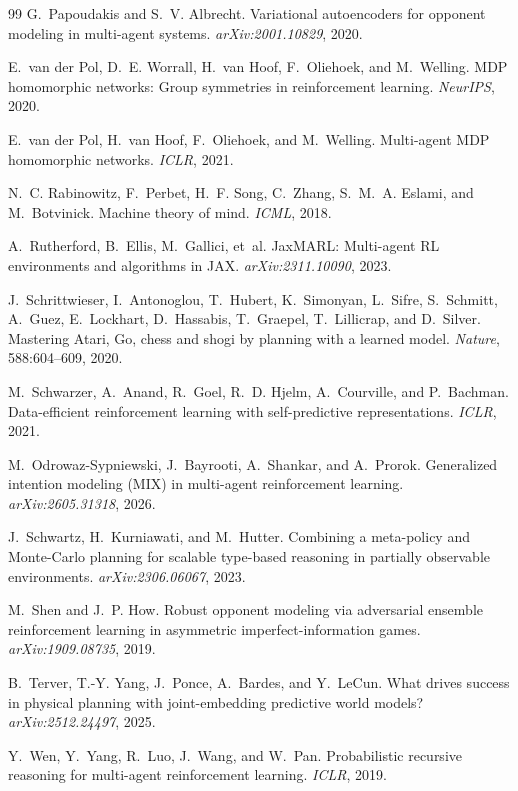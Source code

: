 \documentclass[11pt]{article}
\begin{document}
\begin{thebibliography}{99}
 G.~Papoudakis and S.~V. Albrecht. Variational
autoencoders for opponent modeling in multi-agent systems.
\emph{arXiv:2001.10829}, 2020.

 E.~van der Pol, D.~E. Worrall, H.~van Hoof, F.~Oliehoek,
and M.~Welling. MDP homomorphic networks: Group symmetries in reinforcement
learning. \emph{NeurIPS}, 2020.

 E.~van der Pol, H.~van Hoof, F.~Oliehoek, and M.~Welling.
Multi-agent MDP homomorphic networks. \emph{ICLR}, 2021.

 N.~C. Rabinowitz, F.~Perbet, H.~F. Song, C.~Zhang,
S.~M.~A. Eslami, and M.~Botvinick. Machine theory of mind. \emph{ICML}, 2018.

 A.~Rutherford, B.~Ellis, M.~Gallici, et~al. JaxMARL: Multi-agent
RL environments and algorithms in JAX. \emph{arXiv:2311.10090}, 2023.

 J.~Schrittwieser, I.~Antonoglou, T.~Hubert,
K.~Simonyan, L.~Sifre, S.~Schmitt, A.~Guez, E.~Lockhart, D.~Hassabis, T.~Graepel,
T.~Lillicrap, and D.~Silver. Mastering Atari, Go, chess and shogi by planning with
a learned model. \emph{Nature}, 588:604--609, 2020.

 M.~Schwarzer, A.~Anand, R.~Goel, R.~D. Hjelm, A.~Courville,
and P.~Bachman. Data-efficient reinforcement learning with self-predictive
representations. \emph{ICLR}, 2021.

 M.~Odrowaz-Sypniewski, J.~Bayrooti, A.~Shankar, and
A.~Prorok. Generalized intention modeling (MIX) in multi-agent reinforcement
learning. \emph{arXiv:2605.31318}, 2026.

 J.~Schwartz, H.~Kurniawati, and M.~Hutter.
Combining a meta-policy and Monte-Carlo planning for scalable type-based
reasoning in partially observable environments. \emph{arXiv:2306.06067}, 2023.

 M.~Shen and J.~P. How. Robust opponent modeling via adversarial
ensemble reinforcement learning in asymmetric imperfect-information games.
\emph{arXiv:1909.08735}, 2019.

 B.~Terver, T.-Y. Yang, J.~Ponce, A.~Bardes, and Y.~LeCun.
What drives success in physical planning with joint-embedding predictive world
models? \emph{arXiv:2512.24497}, 2025.

 Y.~Wen, Y.~Yang, R.~Luo, J.~Wang, and W.~Pan. Probabilistic
recursive reasoning for multi-agent reinforcement learning. \emph{ICLR}, 2019.


\end{thebibliography}
\end{document}
